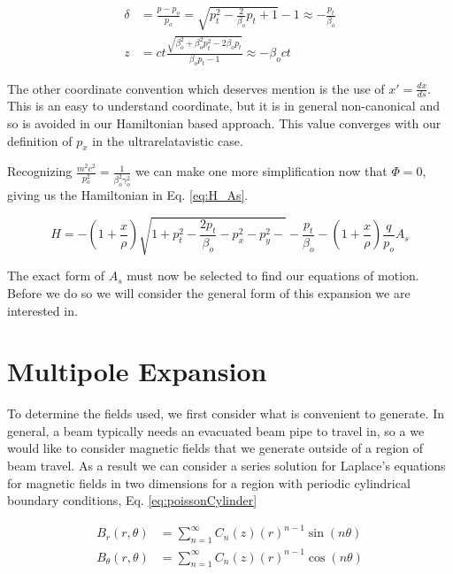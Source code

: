 \begin{equation} \label{eq:delCoord}
\begin{split}
	\delta &= \frac{p-p_o}{p_o} = \sqrt{p_t^2 -\frac{2}{\beta_o}p_t + 1} -1 \approx -\frac{p_t}{\beta_o}\\
	z &= ct\frac{\sqrt{\beta_o^2 + \beta_o^2 p_t^2 - 2\beta_o p_t}}{\beta_o p_t - 1} \approx  - \beta_o c t
\end{split}
\end{equation}

The other coordinate convention which deserves mention is the use of $x' = \frac{dx}{ds}$. This is an easy to understand coordinate, but it is in general non-canonical and so is avoided in our Hamiltonian based approach. This value converges with our definition of $p_x$ in the ultrarelatavistic case.

Recognizing $\frac{m^2c^2}{p_o^2} = \frac{1}{\beta_o^2 \gamma_o^2}$ we can make one more simplification now that $\Phi = 0$, giving us the Hamiltonian in Eq. \ref{eq:H_As}.

\begin{equation} \label{eq:H_As}
	H = -\left(1 + \frac{x}{\rho}\right)\sqrt{1 + p_t^2 - \frac{2 p_t}{\beta_o} - p_x^2 - p_y^2- } - \frac{p_t}{\beta_o} - \left(1 + \frac{x}{\rho}\right)\frac{q}{p_o}A_s
\end{equation}

The exact form of $A_s$ must now be selected to find our equations of motion. Before we do so we will consider the general form of this expansion we are interested in.

\section{Multipole Expansion} \label{sec:multipole}

To determine the fields used, we first consider what is convenient to generate. In general, a beam typically needs an evacuated beam pipe to travel in, so a we would like to consider magnetic fields that we generate outside of a region of beam travel. As a result we can consider a series solution for Laplace's equations for magnetic fields in two dimensions for a region with periodic cylindrical boundary conditions, Eq. \ref{eq:poissonCylinder}

\begin{equation} \label{eq:poissonCylinder}
\begin{split}
	B_r(r,\theta) &= \sum_{n=1}^{\infty} C_n(z) \left( r \right)^{n-1} \sin{(n\theta)}\\
	B_\theta(r,\theta) &= \sum_{n=1}^{\infty} C_n(z) \left( r \right)^{n-1} \cos{(n\theta)}
\end{split}
\end{equation}

